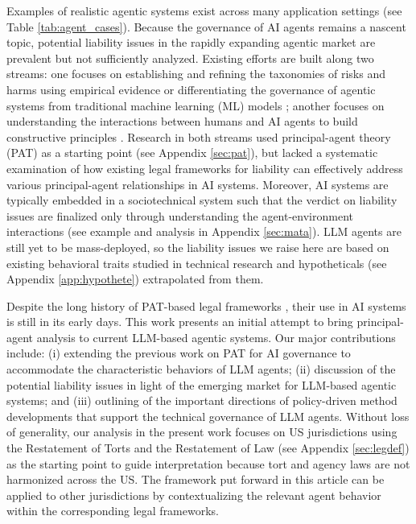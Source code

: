 \documentclass[11pt]{article}
\begin{document}
Examples of realistic agentic systems exist across many application settings (see Table \ref{tab:agent_cases}). Because the governance of AI agents remains a nascent topic, potential liability issues in the rapidly expanding agentic market are prevalent but not sufficiently analyzed. Existing efforts are built along two streams: one focuses on establishing and refining the taxonomies of risks and harms using empirical evidence \citep{chan_harms_2023,chan_visibility_2024,he_security_2024,hammond_multiagent_2025} or differentiating the governance of agentic systems from traditional machine learning (ML) models \citep{cohen_regulating_2024,kolt_governing_2025}; another focuses on understanding the interactions between humans and AI agents to build constructive principles \citep{zheng_synergizing_2023}. Research in both streams used principal-agent theory (PAT) \citep{eisenhardt_agency_1989,laffont_theory_2002} as a starting point (see Appendix \ref{sec:pat}), but lacked a systematic examination of how existing legal frameworks for liability can effectively address various principal-agent relationships in AI systems. Moreover, AI systems are typically embedded in a sociotechnical system \citep{weidinger_sociotechnical_2023} such that the verdict on liability issues are finalized only through understanding the agent-environment interactions (see example and analysis in Appendix \ref{sec:mata}). LLM agents are still yet to be mass-deployed, so the liability issues we raise here are based on existing behavioral traits studied in technical research and hypotheticals (see Appendix \ref{app:hypothete}) extrapolated from them.

Despite the long history of PAT-based legal frameworks \citep{munday_agency_2022}, their use in AI systems is still in its early days. This work presents an initial attempt to bring principal-agent analysis to current LLM-based agentic systems. Our major contributions include: (i) extending the previous work on PAT for AI governance to accommodate the characteristic behaviors of LLM agents; (ii) discussion of the potential liability issues in light of the emerging market for LLM-based agentic systems; and (iii) outlining of the important directions of policy-driven method developments that support the technical governance of LLM agents. Without loss of generality, our analysis in the present work focuses on US jurisdictions using the Restatement of Torts and the Restatement of Law (see Appendix \ref{sec:legdef}) as the starting point to guide interpretation because tort and agency laws are not harmonized across the US. The framework put forward in this article can be applied to other jurisdictions by contextualizing the relevant agent behavior within the corresponding legal frameworks.
\end{document}
